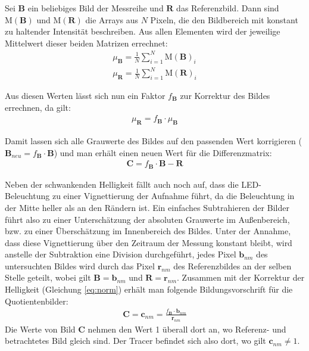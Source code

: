 Sei $\mathbf{B}$ ein beliebiges Bild der Messreihe und $\mathbf{R}$ das Referenzbild. Dann sind 
$\mathrm{M(\mathbf{B})}$ und $\mathrm{M(\mathbf{R})}$ die Arrays aus $N$ Pixeln, die den Bildbereich mit konstant zu haltender Intensität beschreiben. Aus allen Elementen 
wird der jeweilige Mittelwert dieser beiden Matrizen errechnet:
\begin{eqnarray}
 \mu_{\mathbf{B}} = \frac{1}{N} \sum_{i=1}^N \mathrm{M(\mathbf{B})}_i \\
 \mu_{\mathbf{R}} = \frac{1}{N} \sum_{i=1}^N \mathrm{M(\mathbf{R})}_i
\end{eqnarray}

Aus diesen Werten lässt sich nun ein Faktor $f_{\mathbf{B}}$ zur Korrektur des Bildes errechnen, da gilt:
\begin{eqnarray}
 \mu_{\mathbf{R}} = f_{\mathbf{B}} \cdot \mu_{\mathbf{B}}
 \label{eq:norm}
\end{eqnarray}

Damit lassen sich alle Grauwerte des Bildes auf den passenden Wert korrigieren ($\mathbf{B}_{neu} = f_{\mathbf{B}} \cdot \mathbf{B}$) und man erhält einen neuen Wert für die 
Differenzmatrix:
\begin{eqnarray}
 \mathbf{C} = f_{\mathbf{B}} \cdot \mathbf{B} - \mathbf{R}
\end{eqnarray}


Neben der schwankenden Helligkeit fällt auch noch auf, dass die LED-Beleuchtung zu einer Vignettierung der Aufnahme führt, da die Beleuchtung in der Mitte heller als an den Rändern ist. Ein einfaches Subtrahieren der Bilder führt also zu einer Unterschätzung der absoluten Grauwerte im Außenbereich, bzw. zu einer Überschätzung im Innenbereich des Bildes.
Unter der Annahme, dass diese Vignettierung über den Zeitraum der Messung konstant bleibt, wird anstelle der Subtraktion eine Division durchgeführt, \dah jedes Pixel $\mathbf{b}_{nm}$ des untersuchten Bildes wird durch das Pixel $\mathbf{r}_{nm}$ des Referenzbildes an der selben Stelle geteilt, wobei gilt $\mathbf{B} = \mathbf{b}_{nm}$ und $\mathbf{R} = \mathbf{r}_{nm}$. Zusammen mit der Korrektur der Helligkeit (Gleichung \ref{eq:norm}) erhält man folgende Bildungsvorschrift für die Quotientenbilder:
\begin{eqnarray}
 \mathbf{C} = \mathbf{c}_{nm} = \frac{f_{\mathbf{B}} \cdot \mathbf{b}_{nm}}{\mathbf{r}_{nm}}
 \label{eq:quot}
\end{eqnarray}
Die Werte von Bild $\mathbf{C}$ nehmen den Wert 1 überall dort an, wo Referenz- und betrachtetes Bild gleich sind. Der Tracer befindet sich also dort, wo gilt 
$\mathbf{c}_{nm} \neq 1$.

